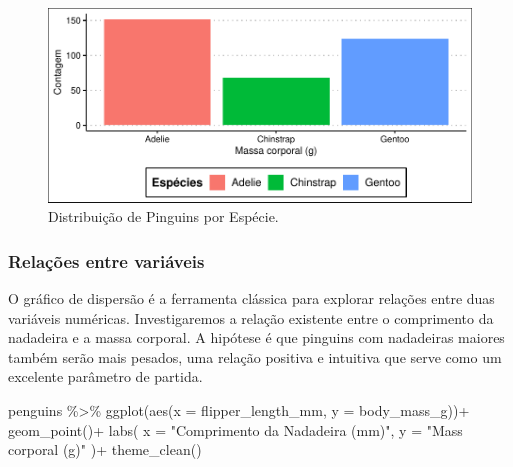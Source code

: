\documentclass[
  12pt,
  letterpaper,
  DIV=11,
  numbers=noendperiod]{scrreprt}
\newenvironment{Shaded}{\begin{snugshade}}{\end{snugshade}}
\newcommand{\AttributeTok}[1]{\textcolor[rgb]{0.40,0.45,0.13}{#1}}
\newcommand{\FunctionTok}[1]{\textcolor[rgb]{0.28,0.35,0.67}{#1}}
\newcommand{\NormalTok}[1]{\textcolor[rgb]{0.00,0.23,0.31}{#1}}
\newcommand{\SpecialCharTok}[1]{\textcolor[rgb]{0.37,0.37,0.37}{#1}}
\newcommand{\StringTok}[1]{\textcolor[rgb]{0.13,0.47,0.30}{#1}}
\theoremstyle{definition}
\theoremstyle{exemplo}
\begin{document}
\begin{figure}[H]

{\centering \includegraphics{03-tidyverse_files/figure-pdf/unnamed-chunk-27-1.pdf}

}

\caption{Distribuição de Pinguins por Espécie.}

\end{figure}%

\subsubsection{Relações entre
variáveis}\label{relauxe7uxf5es-entre-variuxe1veis}

O gráfico de dispersão é a ferramenta clássica para explorar relações
entre duas variáveis numéricas. Investigaremos a relação existente entre
o comprimento da nadadeira e a massa corporal. A hipótese é que pinguins
com nadadeiras maiores também serão mais pesados, uma relação positiva e
intuitiva que serve como um excelente parâmetro de partida.

\begin{Shaded}
\begin{Highlighting}[]
\NormalTok{penguins }\SpecialCharTok{\%\textgreater{}\%} 
  \FunctionTok{ggplot}\NormalTok{(}\FunctionTok{aes}\NormalTok{(}\AttributeTok{x =}\NormalTok{ flipper\_length\_mm, }\AttributeTok{y =}\NormalTok{ body\_mass\_g))}\SpecialCharTok{+}
    \FunctionTok{geom\_point}\NormalTok{()}\SpecialCharTok{+}
    \FunctionTok{labs}\NormalTok{(}
      \AttributeTok{x =} \StringTok{"Comprimento da Nadadeira (mm)"}\NormalTok{,}
      \AttributeTok{y =} \StringTok{"Mass corporal (g)"}
\NormalTok{    )}\SpecialCharTok{+}
  \FunctionTok{theme\_clean}\NormalTok{()}
\end{Highlighting}
\end{Shaded}
\end{document}
